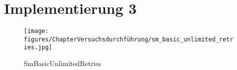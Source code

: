 \section{Implementierung 3}

\begin{figure}[h!]
	\centering
	\texttt{[image: figures/ChapterVersuchsdurchführung/sm\_basic\_unlimited\_retries.jpg]}
	\caption{SmBasicUnlimitedRetries}
\end{figure}
\FloatBarrier
